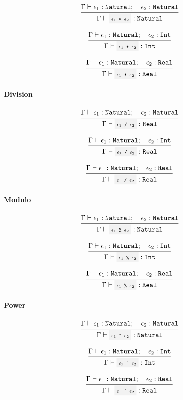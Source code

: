 \[
	\infrule{
		\EnvSym\then \expr_1:\Natural \semiq \expr_2:\Natural
	}{
		\EnvSym\then \code{$\expr_1$ * $\expr_2$} : \Natural
	}
\]


\[
	\infrule{
		\EnvSym\then \expr_1:\Natural \semiq \expr_2:\Int
	}{
		\EnvSym\then \code{$\expr_1$ * $\expr_2$} : \Int
	}
\]

\[
	\infrule{
		\EnvSym\then \expr_1:\Natural \semiq \expr_2:\Real
	}{
		\EnvSym\then \code{$\expr_1$ * $\expr_2$} : \Real
	}
\]

\paragraph{Division}

\[
	\infrule{
		\EnvSym\then \expr_1:\Natural \semiq \expr_2:\Natural
	}{
		\EnvSym\then \code{$\expr_1$ / $\expr_2$} : \Real
	}
\]

\[
	\infrule{
		\EnvSym\then \expr_1:\Natural \semiq \expr_2:\Int
	}{
		\EnvSym\then \code{$\expr_1$ / $\expr_2$} : \Real
	}
\]

\[
	\infrule{
		\EnvSym\then \expr_1:\Natural \semiq \expr_2:\Real
	}{
		\EnvSym\then \code{$\expr_1$ / $\expr_2$} : \Real
	}
\]

\paragraph{Modulo}

\[
	\infrule{
		\EnvSym\then \expr_1:\Natural \semiq \expr_2:\Natural
	}{
		\EnvSym\then \code{$\expr_1$ \% $\expr_2$} : \Natural
	}
\]

\[
	\infrule{
		\EnvSym\then \expr_1:\Natural \semiq \expr_2:\Int
	}{
		\EnvSym\then \code{$\expr_1$ \% $\expr_2$} : \Int
	}
\]

\[
	\infrule{
		\EnvSym\then \expr_1:\Natural \semiq \expr_2:\Real
	}{
		\EnvSym\then \code{$\expr_1$ \% $\expr_2$} : \Real
	}
\]

\paragraph{Power}

\[
	\infrule{
		\EnvSym\then \expr_1:\Natural \semiq \expr_2:\Natural
	}{
		\EnvSym\then \code{$\expr_1$ \^{} $\expr_2$} : \Natural
	}
\]

\[
	\infrule{
		\EnvSym\then \expr_1:\Natural \semiq \expr_2:\Int
	}{
		\EnvSym\then \code{$\expr_1$ \^{} $\expr_2$} : \Int
	}
\]

\[
	\infrule{
		\EnvSym\then \expr_1:\Natural \semiq \expr_2:\Real
	}{
		\EnvSym\then \code{$\expr_1$ \^{} $\expr_2$} : \Real
	}
\]


